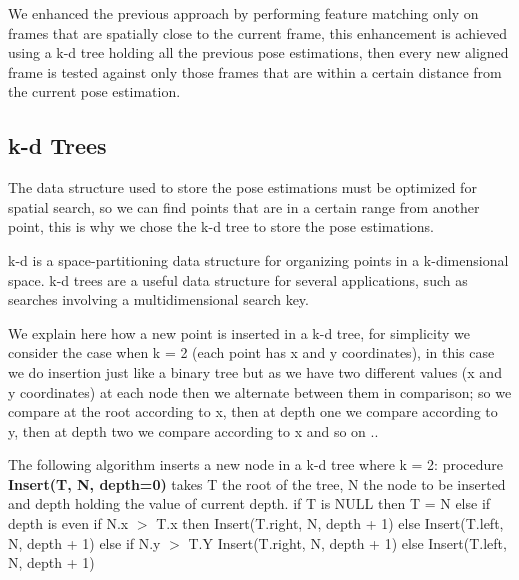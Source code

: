 We enhanced the previous approach by performing feature matching only on frames that are spatially close to the current frame, this enhancement is achieved using a k-d tree holding all the previous pose estimations, then every new aligned frame is tested against only those frames that are within a certain distance from the current pose estimation.

\subsection{k-d Trees}
The data structure used to store the pose estimations must be optimized for spatial search, so we can find points that are in a certain range from another point, this is why we chose the k-d tree to store the pose estimations.

k-d is a space-partitioning data structure for organizing points in a k-dimensional space. k-d trees are a useful data structure for several applications, such as searches involving a multidimensional search key.


We explain here how a new point is inserted in a k-d tree, for simplicity we consider the case when k = 2 (each point has x and y coordinates), in this case we do insertion just like a binary tree but as we have two different values (x and y coordinates) at each node then we alternate between them in comparison; so we compare at the root according to x, then at depth one we compare according to y, then at depth two we compare according to x and so on ..

The following algorithm inserts a new node in a k-d tree where k = 2:\newline
\noindent procedure {\bf Insert(T, N, depth=0)} takes T the root of the tree, N the node to be inserted and depth holding the value of current depth.\newline
\noindent if T is NULL\newline
\indent then T = N \newline
else\linebreak
\indent if depth is even\newline
\indent \indent if N.x $>$ T.x \newline
\indent \indent \indent then Insert(T.right, N, depth + 1)\newline
\indent \indent else Insert(T.left, N, depth + 1)\newline
\indent else \newline
\indent \indent if N.y $>$ T.Y\newline
\indent \indent \indent Insert(T.right, N, depth + 1)\newline
\indent \indent else Insert(T.left, N, depth + 1)\newline


